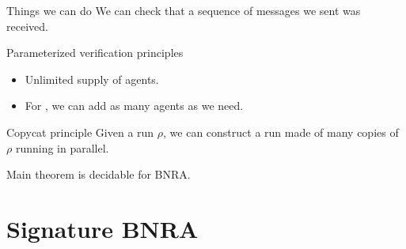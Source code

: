 \documentclass{beamer}
\begin{document}
\begin{frame}{Things we can do}
	We can check that a sequence of messages we sent was received.
	
		
\end{frame}

\begin{frame}{Parameterized verification principles}
	
	\begin{itemize}
		\item Unlimited supply of agents.
		
		\item For {}, we can add as many agents as we need. 
	\end{itemize}
	
	\pause
	
	\begin{block}{Copycat principle}
		Given a run $\rho$, we can construct a run made of many copies of $\rho$ running in parallel.
	\end{block}
	
	\begin{block}{Main theorem}
		{} is decidable for BNRA.
	\end{block}
	
\end{frame}







\section{Signature BNRA}

\begin{frame}
	\tableofcontents[currentsection]
\end{frame}
\end{document}
